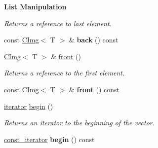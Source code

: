 \begin{Indent}{\bf List Manipulation}
\begin{DoxyCompactItemize}
\begin{DoxyCompactList}\small\item\em Returns a reference to last element. \item\end{DoxyCompactList}\item 
\hypertarget{structcimg__library_1_1_c_img_list_a97a768dae58235483f815d7f1bb13be3}{
const \hyperlink{structcimg__library_1_1_c_img}{CImg}$<$ T $>$ \& {\bfseries back} () const }
\label{structcimg__library_1_1_c_img_list_a97a768dae58235483f815d7f1bb13be3}

\item 
\hypertarget{structcimg__library_1_1_c_img_list_a4fe827ce3da4d8c7242c5779985c06b2}{
\hyperlink{structcimg__library_1_1_c_img}{CImg}$<$ T $>$ \& \hyperlink{structcimg__library_1_1_c_img_list_a4fe827ce3da4d8c7242c5779985c06b2}{front} ()}
\label{structcimg__library_1_1_c_img_list_a4fe827ce3da4d8c7242c5779985c06b2}

\begin{DoxyCompactList}\small\item\em Returns a reference to the first element. \item\end{DoxyCompactList}\item 
\hypertarget{structcimg__library_1_1_c_img_list_a0568ebe130adb22e568d579003a586d6}{
const \hyperlink{structcimg__library_1_1_c_img}{CImg}$<$ T $>$ \& {\bfseries front} () const }
\label{structcimg__library_1_1_c_img_list_a0568ebe130adb22e568d579003a586d6}

\item 
\hypertarget{structcimg__library_1_1_c_img_list_a732e8012e8d1625e67d45badf79dad60}{
\hyperlink{structcimg__library_1_1_c_img}{iterator} \hyperlink{structcimg__library_1_1_c_img_list_a732e8012e8d1625e67d45badf79dad60}{begin} ()}
\label{structcimg__library_1_1_c_img_list_a732e8012e8d1625e67d45badf79dad60}

\begin{DoxyCompactList}\small\item\em Returns an iterator to the beginning of the vector. \item\end{DoxyCompactList}\item 
\hypertarget{structcimg__library_1_1_c_img_list_a97e93af1ea785a4f6f30a0fa6a9d29ba}{
\hyperlink{structcimg__library_1_1_c_img}{const\_\-iterator} {\bfseries begin} () const }
\label{structcimg__library_1_1_c_img_list_a97e93af1ea785a4f6f30a0fa6a9d29ba}


\end{DoxyCompactItemize}
\end{Indent}

